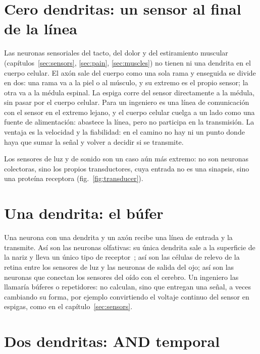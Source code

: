 \section{Cero dendritas: un sensor al final de la línea}

Las neuronas sensoriales del tacto, del dolor y del estiramiento muscular (capítulos~\ref{sec:sensors}, \ref{sec:pain}, \ref{sec:muscles}) no tienen ni una dendrita en el cuerpo celular. El axón sale del cuerpo como una sola rama y enseguida se divide en dos: una rama va a la piel o al músculo, y su extremo es el propio sensor; la otra va a la médula espinal. La espiga corre del sensor directamente a la médula, sin pasar por el cuerpo celular. Para un ingeniero es una línea de comunicación con el sensor en el extremo lejano, y el cuerpo celular cuelga a un lado como una fuente de alimentación: abastece la línea, pero no participa en la transmisión. La ventaja es la velocidad y la fiabilidad: en el camino no hay ni un punto donde haya que sumar la señal y volver a decidir si se transmite.

Los sensores de luz y de sonido son un caso aún más extremo: no son neuronas colectoras, sino los propios transductores, cuya entrada no es una sinapsis, sino una proteína receptora (fig.~\ref{fig:transducer}).

\section{Una dendrita: el búfer}

Una neurona con una dendrita y un axón recibe una línea de entrada y la transmite. Así son las neuronas olfativas: su única dendrita sale a la superficie de la nariz y lleva un único tipo de receptor~\cite{Mombaerts2004}; así son las células de relevo de la retina entre los sensores de luz y las neuronas de salida del ojo; así son las neuronas que conectan los sensores del oído con el cerebro. Un ingeniero las llamaría búferes o repetidores: no calculan, sino que entregan una señal, a veces cambiando su forma, por ejemplo convirtiendo el voltaje continuo del sensor en espigas, como en el capítulo~\ref{sec:sensors}.

\section{Dos dendritas: AND temporal}

